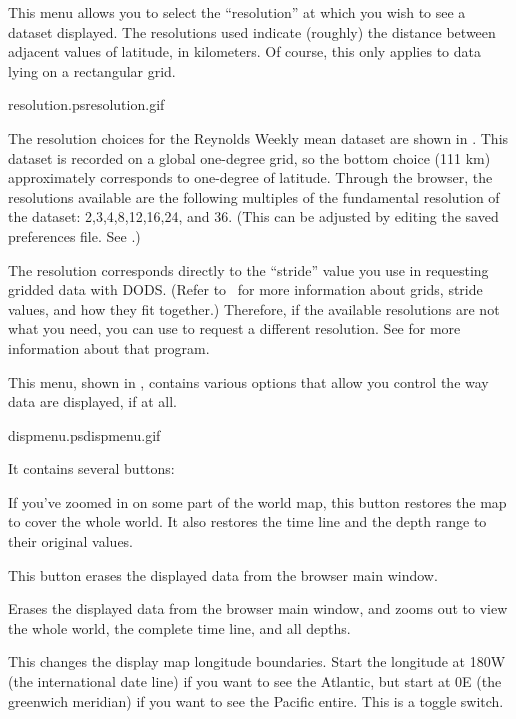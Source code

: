 This menu allows you to select the ``resolution'' at
which you wish to see a dataset displayed. The resolutions used
indicate (roughly) the distance between adjacent values of latitude,
in kilometers. Of course, this only applies to data lying on a
rectangular grid.  

{resolution.ps}{resolution.gif}{}

The resolution choices for the Reynolds Weekly mean dataset are shown
in .  This dataset is recorded on a
global one-degree grid, so the bottom choice (111 km) approximately
corresponds to one-degree of latitude.  Through the browser, the
resolutions available are the following multiples of the fundamental
resolution of the dataset: 2,3,4,8,12,16,24, and 36.  (This can be
adjusted by editing the saved preferences file.  See
.) 

The resolution corresponds directly to the ``stride'' value you use in
requesting gridded data with DODS.  (Refer to \DODSuser\ for more
information about grids, stride values, and how they fit together.)
Therefore, if the available resolutions are not what you need, you can
use  to request a different resolution.  See
 for more information about that program.


This menu, shown in , contains various
options that allow you control the way data are displayed, if at all.

%
{dispmenu.ps}{dispmenu.gif}{}

It contains several buttons:

\begin{description}


If you've zoomed in on some part of the world map, this button
restores the map to cover the whole world.  It also restores the time
line and the depth range to their original values.


This button erases the displayed data from the browser main window.


Erases the displayed data from the browser main window, and zooms out
to view the whole world, the complete time line, and all depths.


This changes the display map longitude boundaries. Start the longitude
at 180W (the international date line) if you want to see the Atlantic,
but start at 0E (the greenwich meridian) if you want to see the
Pacific entire. This is a toggle switch.

\end{description}

